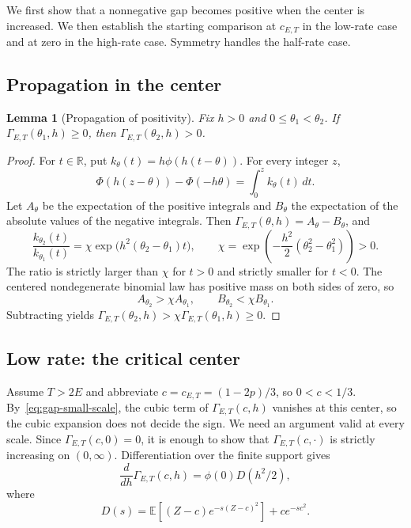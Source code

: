 \documentclass[11pt]{article}
\newtheorem{lemma}[theorem]{Lemma}
\theoremstyle{remark}
\newcommand{\R}{\mathbb R}
\newcommand{\E}{\mathbb E}
\begin{document}
We first show that a nonnegative gap becomes positive when the center is
increased. We then establish the starting comparison at $c_{E,T}$ in the
low-rate case and at zero in the high-rate case. Symmetry handles the
half-rate case.

\subsection*{Propagation in the center}
\begin{lemma}[Propagation of positivity]\label{lem:binomial-propagation}
Fix $h>0$ and $0\leq\theta_1<\theta_2$. If
$\Gamma_{E,T}(\theta_1,h)\geq0$, then
$\Gamma_{E,T}(\theta_2,h)>0$.
\end{lemma}

\begin{proof}
For $t\in\R$, put $k_\theta(t)=h\phi(h(t-\theta))$. For every integer $z$,
\[
 \Phi(h(z-\theta))-\Phi(-h\theta)=\int_0^z k_\theta(t)\,dt.
\]
Let $A_\theta$ be the expectation of the positive integrals and $B_\theta$
the expectation of the absolute values of the negative integrals. Then
$\Gamma_{E,T}(\theta,h)=A_\theta-B_\theta$, and
\[
 \frac{k_{\theta_2}(t)}{k_{\theta_1}(t)}
 =\chi\exp\bigl(h^2(\theta_2-\theta_1)t\bigr),
 \qquad
 \chi=\exp\left(-\frac{h^2}{2}(\theta_2^2-\theta_1^2)\right)>0.
\]
The ratio is strictly larger than $\chi$ for $t>0$ and strictly smaller for
$t<0$. The centered nondegenerate binomial law has positive mass on both
sides of zero, so
\[
 A_{\theta_2}>\chi A_{\theta_1},\qquad
 B_{\theta_2}<\chi B_{\theta_1}.
\]
Subtracting yields
$\Gamma_{E,T}(\theta_2,h)>\chi\Gamma_{E,T}(\theta_1,h)\geq0$.
\end{proof}

\subsection*{Low rate: the critical center}
Assume $T>2E$ and abbreviate $c=c_{E,T}=(1-2p)/3$, so $0<c<1/3$.
By~\eqref{eq:gap-small-scale}, the cubic term of $\Gamma_{E,T}(c,h)$
vanishes at this center, so the cubic expansion does not decide the sign.
We need an argument valid at every scale. Since $\Gamma_{E,T}(c,0)=0$, it is
enough to show that $\Gamma_{E,T}(c,\cdot)$ is strictly increasing on
$(0,\infty)$. Differentiation over the finite support gives
\begin{equation}\label{eq:binomial-scale-derivative}
 \frac{d}{dh}\Gamma_{E,T}(c,h)=\phi(0)D(h^2/2),
\end{equation}
where
\begin{equation}\label{eq:binomial-laplace}
 D(s)=\E[(Z-c)e^{-s(Z-c)^2}]+ce^{-sc^2}.
\end{equation}
\end{document}

